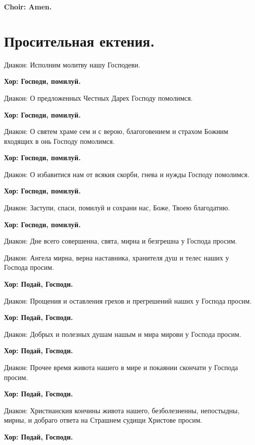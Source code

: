 \documentclass[12pt,a4paper,titlepage]{report}
\begin{document}
\begin{paracol}[1]{2}
	\textbf{Choir: Amen.}
	
	\switchcolumn[1]
	
	\section*{Просительная ектения.}
	
	Диакон: Исполним молитву нашу Господеви.
	
	\textbf{Хор: Господи, помилуй.}
	
	Диакон: О предложенных Честных Дарех Господу помолимся.
	
	\textbf{Хор: Господи, помилуй.}
	
	Диакон: О святем храме сем и с верою, благоговением и страхом Божиим входящих в онь Господу помолимся.
	
	\textbf{Хор: Господи, помилуй.}
	
	Диакон: О избавитися нам от всякия скорби, гнева и нужды Господу помолимся.
	
	\textbf{Хор: Господи, помилуй.}
	
	Диакон: Заступи, спаси, помилуй и сохрани нас, Боже, Твоею благодатию.
	
	\textbf{Хор: Господи, помилуй.}
	
	Диакон: Дне всего совершенна, свята, мирна и безгрешна у Господа просим.
	
	
	Диакон: Ангела мирна, верна наставника, хранителя душ и телес наших у Господа просим.
	
	\textbf{Хор: Подай, Господи.}
	
	Диакон: Прощения и оставления грехов и прегрешений наших у Господа просим.
	
	\textbf{Хор: Подай, Господи.}
	
	Диакон: Добрых и полезных душам нашым и мира мирови у Господа просим.
	
	\textbf{Хор: Подай, Господи.}
	
	Диакон: Прочее время живота нашего в мире и покаянии скончати у Господа просим.
	
	\textbf{Хор: Подай, Господи.}
	
	Диакон: Христианския кончины живота нашего, безболезненны, непостыдны, мирны, и добраго ответа на Страшнем судищи Христове просим.
	
	\textbf{Хор: Подай, Господи.}
	

\end{paracol}
\end{document}
